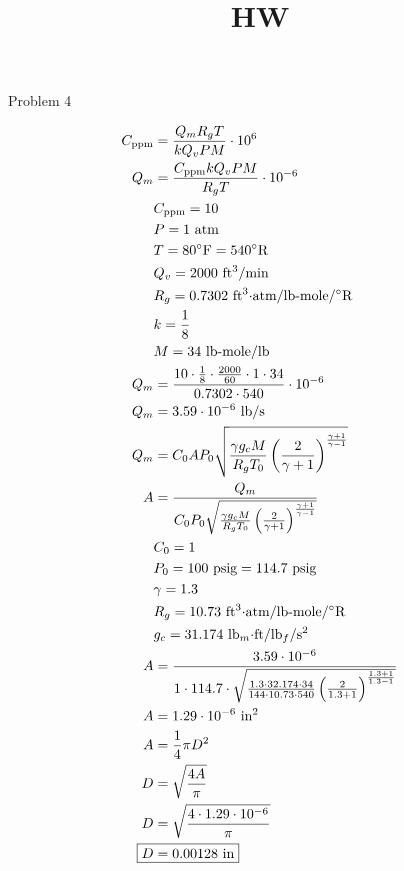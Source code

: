 \documentclass[12pt]{article}
\title{HW}
\date{}
\begin{document}

Problem 4
    
\begin{align*}
    C_{\text{ppm}} &= \frac{Q_m R_g T}{k Q_v P M} \cdot 10^6 \\
    Q_m &= \frac{C_{\text{ppm}} k Q_v P M}{R_g T} \cdot 10^{-6} \\
    & C_{\text{ppm}} = 10 \\
    & P = 1 \text{ atm} \\
    & T = 80 ^\circ\text{F} = 540 ^\circ\text{R} \\
    & Q_v = 2000 \text{ ft$^3$/min} \\
    & R_g = 0.7302 \text{ ft$^3 \cdot$atm/lb-mole/$^\circ$R} \\
    & k = \frac{1}{8} \\
    & M = 34 \text{ lb-mole/lb} \\
    Q_m &= \frac{10 \cdot \frac{1}{8} \cdot \frac{2000}{60} \cdot 1 \cdot 34}{0.7302 \cdot 540} \cdot 10^{-6} \\
    Q_m &= 3.59 \cdot 10^{-6} \text{ lb/s} \\
    Q_m &= C_0 A P_0 \sqrt{\frac{\gamma g_c M}{R_g T_0} \left(\frac{2}{\gamma + 1}\right)^{\frac{\gamma + 1}{\gamma - 1}}} \\
    A &= \frac{Q_m }{C_0 P_0 \sqrt{\frac{\gamma g_c M}{R_g T_0} \left(\frac{2}{\gamma + 1}\right)^{\frac{\gamma + 1}{\gamma - 1}}}} \\
    & C_0 = 1 \\
    & P_0 = 100 \text{ psig} = 114.7 \text{ psig} \\
    & \gamma = 1.3 \\
    & R_g = 10.73 \text{ ft$^3 \cdot$atm/lb-mole/$^\circ$R} \\
    & g_c = 31.174 \text{ lb$_{m}\cdot$ft/lb$_f$/s$^2$} \\
    A &= \frac{3.59 \cdot 10^{-6}}{1 \cdot 114.7 \cdot \sqrt{\frac{1.3 \cdot 32.174 \cdot 34}{144 \cdot 10.73 \cdot 540} \left(\frac{2}{1.3 + 1}\right)^{\frac{1.3 + 1}{1.3 - 1}}}} \\
    A &= 1.29 \cdot 10^{-6} \text{ in$^2$} \\
    A &= \frac{1}{4}\pi D^2 \\
    D &= \sqrt{\frac{4 A}{\pi}} \\
    D &= \sqrt{\frac{4 \cdot 1.29 \cdot 10^{-6}}{\pi}} \\
    \Aboxed{D &= 0.00128 \text{ in}}
\end{align*}
\end{document}
